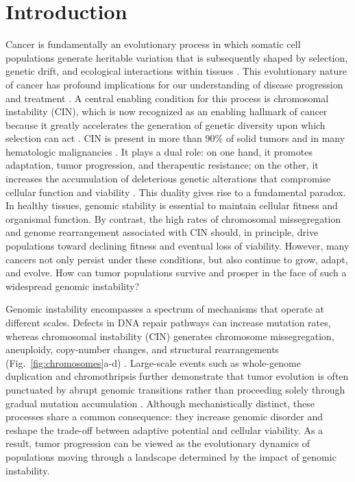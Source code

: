 \documentclass[10pt, aps, rmp,  twocolumn, superscriptaddress, floatfix, showkeys]{revtex4-2}
\begin{document}
\section*{Introduction}

Cancer is fundamentally an evolutionary process in which somatic cell populations generate heritable variation that is subsequently shaped by selection, genetic drift, and ecological interactions within tissues \cite{Cairns1975,Merlo2006-sh,basanta2017homeostasis}. This evolutionary nature of cancer has profound implications for our understanding of disease progression and treatment \cite{gatenby2003evolutionary,gatenby2018evolution,gatenby2020integrating,Vendramin2021}. A central enabling condition for this process is chromosomal instability (CIN), which is now recognized as an enabling hallmark of cancer because it greatly accelerates the generation of genetic diversity upon which selection can act \cite{thompson2010mechanisms,HanahanWeinberg2011,Hanahan2022,Negrini2010,chen2025chromosomal}. CIN is present in more than $90 \%$ of solid tumors and in many hematologic malignancies \cite{drews2022pan,hosea2024two}. It plays a dual role: on one hand, it promotes adaptation, tumor progression, and therapeutic resistance; on the other, it increases the accumulation of deleterious genetic alterations that compromise cellular function and viability \cite{loeb_mutator_2001,breivik2005evolutionary,Negrini2010,sheltzer2011aneuploidy,Gordon2012,chunduri2019diverse}.
This duality gives rise to a fundamental paradox. In healthy tissues, genomic stability is essential to maintain cellular fitness and organismal function. By contrast, the high rates of chromosomal missegregation and genome rearrangement associated with CIN should, in principle, drive populations toward declining fitness and eventual loss of viability. However, many cancers not only persist under these conditions, but also continue to grow, adapt, and evolve. How can tumor populations survive and prosper in the face of such a widespread genomic instability?


Genomic instability encompasses a spectrum of mechanisms that operate at different scales. Defects in DNA repair pathways can increase mutation rates, whereas chromosomal instability (CIN) generates chromosome missegregation, aneuploidy, copy-number changes, and structural rearrangements (Fig.~\ref{fig:chromosomes}a-d) \cite{Lengauer1998,Gordon2012}. Large-scale events such as 
whole-genome duplication and chromothripsis further demonstrate that tumor evolution is often punctuated by abrupt genomic transitions rather than proceeding solely through gradual mutation accumulation \cite{Negrini2010,Vendramin2021}. Although mechanistically 
distinct, these processes share a common consequence: they increase genomic disorder and reshape the trade-off between adaptive potential and cellular viability. As a result, tumor progression can be viewed as the evolutionary dynamics of populations moving through a landscape determined by the impact of genomic instability.
\end{document}
